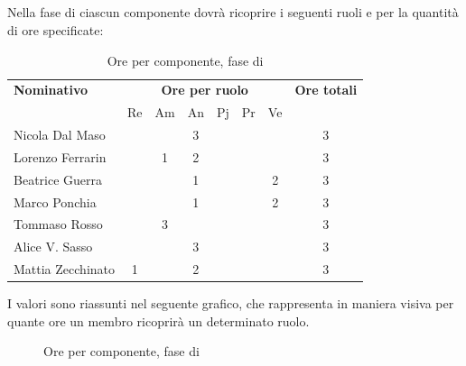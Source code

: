 \subsection{\AD}
Nella fase di \AD{} ciascun componente dovrà ricoprire i seguenti ruoli e per la quantità di ore specificate:

\begin{table}[H]
	\centering
	\begin{tabular}{|l|c|c|c|c|c|c|c|}
		\hline
		\textbf{Nominativo} & 
		\multicolumn{6}{c|}{\textbf{Ore per ruolo}} & 
		\textbf{Ore totali} \\
		& Re & Am & An & Pj & Pr & Ve & \\
		\hline
		Nicola Dal Maso & & & 3 & & &  & 3 \\
		Lorenzo Ferrarin & & 1 & 2 & & &  & 3 \\
		Beatrice Guerra & & & 1 & & & 2 & 3 \\
		Marco Ponchia & & & 1 & & & 2 & 3 \\
		Tommaso Rosso & & 3 & & & & & 3 \\
		Alice V. Sasso & & & 3 & & & & 3 \\
		Mattia Zecchinato & 1 & & 2 & & & & 3 \\
		\hline
	\end{tabular}
	\caption{Ore per componente, fase di \AD}
\end{table}
I valori sono riassunti nel seguente grafico, che rappresenta in maniera visiva per quante ore un membro ricoprirà un determinato ruolo.
\begin{figure}[H]
	\centering
	\caption{Ore per componente, fase di \AD}
\end{figure}

